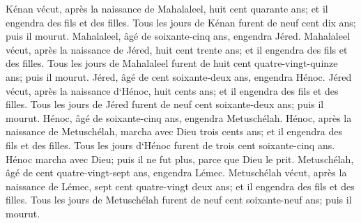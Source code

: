 \verse Kénan vécut, après la naissance de Mahalaleel, huit cent quarante ans; et il engendra des fils et des filles. 
\verse Tous les jours de Kénan furent de neuf cent dix ans; puis il mourut. 
\verse Mahalaleel, âgé de soixante-cinq ans, engendra Jéred. 
\verse Mahalaleel vécut, après la naissance de Jéred, huit cent trente ans; et il engendra des fils et des filles. 
\verse Tous les jours de Mahalaleel furent de huit cent quatre-vingt-quinze ans; puis il mourut. 
\verse Jéred, âgé de cent soixante-deux ans, engendra Hénoc. 
\verse Jéred vécut, après la naissance d`Hénoc, huit cents ans; et il engendra des fils et des filles. 
\verse Tous les jours de Jéred furent de neuf cent soixante-deux ans; puis il mourut. 
\verse Hénoc, âgé de soixante-cinq ans, engendra Metuschélah. 
\verse Hénoc, après la naissance de Metuschélah, marcha avec Dieu trois cents ans; et il engendra des fils et des filles. 
\verse Tous les jours d`Hénoc furent de trois cent soixante-cinq ans. 
\verse Hénoc marcha avec Dieu; puis il ne fut plus, parce que Dieu le prit. 
\verse Metuschélah, âgé de cent quatre-vingt-sept ans, engendra Lémec. 
\verse Metuschélah vécut, après la naissance de Lémec, sept cent quatre-vingt deux ans; et il engendra des fils et des filles. 
\verse Tous les jours de Metuschélah furent de neuf cent soixante-neuf ans; puis il mourut. 
